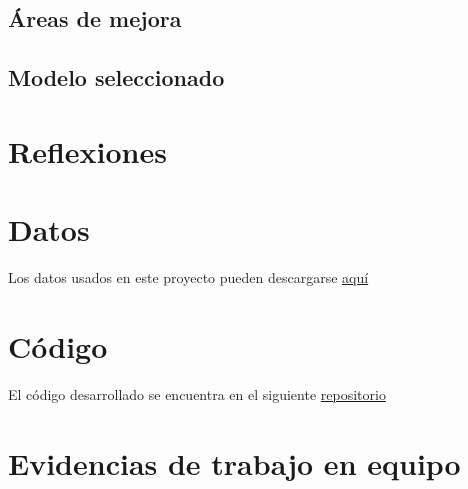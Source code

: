 \documentclass[journal]{IEEEtran}                                                          %
\begin{document}
        \subsection{Áreas de mejora} \label{improvements}

        \subsection{Modelo seleccionado} \label{selected-model}

    \section{Reflexiones} \label{thoughts}
    
    \appendices
    
    \section{Datos}
        Los datos usados en este proyecto pueden descargarse \href{https://www.kaggle.com/code/ravaliraj/risk-classification-of-cervical-cancer}{aquí}

    \section{Código}
        El código desarrollado se encuentra en el siguiente \href{https://github.com/JuanEcheagaray75/cancer-clf}{repositorio}
    \section{Evidencias de trabajo en equipo}
    
    
\end{document}
